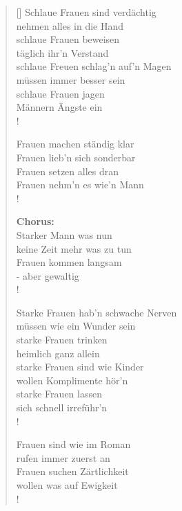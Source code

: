 \documentclass[a4paper]{scrartcl}
\begin{document}
 \newcommand{\attrib}[1]{\nopagebreak{\raggedleft\footnotesize #1\par}}
 \settowidth{\versewidth}{Männer sind auf dieser Welt einfach unersetzlich.;}

 \begin{verse}[\versewidth]
Schlaue Frauen sind verdächtig\\
nehmen alles in die Hand\\
schlaue Frauen beweisen\\
täglich ihr'n Verstand\\
schlaue Freuen schlag'n auf'n Magen\\
müssen immer besser sein\\
schlaue Frauen jagen\\
Männern Ängste ein\\!

Frauen machen ständig klar\\
Frauen lieb'n sich sonderbar\\
Frauen setzen alles dran\\
Frauen nehm'n es wie'n Mann\\!

\textbf{Chorus:}\\
Starker Mann was nun\\
keine Zeit mehr was zu tun\\
Frauen kommen langsam\\
- aber gewaltig\\!

Starke Frauen hab'n schwache Nerven\\
müssen wie ein Wunder sein\\
starke Frauen trinken\\
heimlich ganz allein\\
starke Frauen sind wie Kinder\\
wollen Komplimente hör'n\\
starke Frauen lassen\\
sich schnell irreführ'n\\!

Frauen sind wie im Roman\\
rufen immer zuerst an\\
Frauen suchen Zärtlichkeit\\
wollen was auf Ewigkeit\\!


\end{verse}
\end{document}
